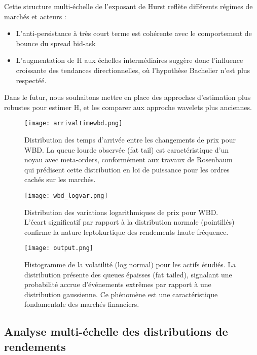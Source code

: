 \documentclass[10pt,a4paper]{article}
\theoremstyle{definition}
\theoremstyle{remark}
\begin{document}
\begin{itemize}
Cette structure multi-échelle de l'exposant de Hurst reflète différents régimes de marchés et acteurs :
\begin{itemize}
    \item L'anti-persistance à très court terme est cohérente avec le comportement de bounce du spread bid-ask
    \item L'augmentation de H aux échelles intermédiaires suggère donc l'influence croissante des tendances directionnelles, où l'hypothèse Bachelier n'est plus respectéé.
\end{itemize}

Dans le futur, nous souhaitons mettre en place des approches d'estimation plus robustes \cite{chong2024minimax, chong2024clt} pour estimer H, et les comparer aux approche wavelets plus anciennes. 

\begin{figure}[h!]
    \centering
    \texttt{[image: arrivaltimewbd.png]}
    \caption{Distribution des temps d'arrivée entre les changements de prix pour WBD. La queue lourde observée (fat tail) est caractéristique d'un noyau avec meta-orders, conformément aux travaux de Rosenbaum qui prédisent cette distribution en loi de puissance pour les ordres cachés sur les marchés.}
    \label{fig:arrival_times_wbd}
\end{figure}

\begin{figure}[h!]
    \centering
    \texttt{[image: wbd\_logvar.png]}
    \caption{Distribution des variations logarithmiques de prix pour WBD. L'écart significatif par rapport à la distribution normale (pointillés) confirme la nature leptokurtique des rendements haute fréquence.}
    \label{fig:log_variations_wbd}
\end{figure}

\begin{figure}[h!]
    \centering
    \texttt{[image: output.png]}
    \caption{Histogramme de la volatilité (log normal) pour les actifs étudiés. La distribution présente des queues épaisses (fat tailed), signalant une probabilité accrue d'événements extrêmes par rapport à une distribution gaussienne. Ce phénomène est une caractéristique fondamentale des marchés financiers.}
    \label{fig:volatility_hist}
\end{figure}

\subsection{Analyse multi-échelle des distributions de rendements}


\end{itemize}
\end{document}
